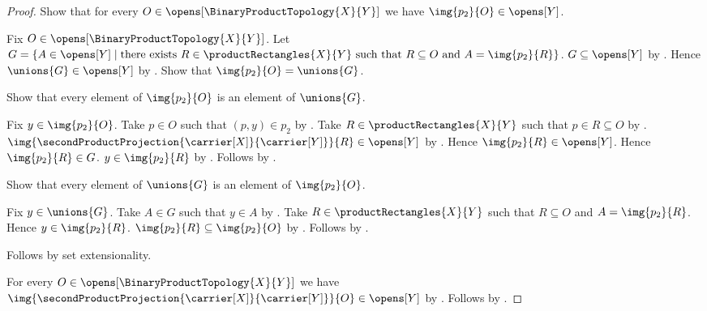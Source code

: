 \begin{proof}
    Show that for every $O\in\opens[\BinaryProductTopology{X}{Y}]$
        we have $\img{p_2}{O}\in\opens[Y]$.
    \begin{subproof}
        Fix $O\in\opens[\BinaryProductTopology{X}{Y}]$.
        Let $G=\{A\in\opens[Y]\mid
            \text{there exists $R\in\productRectangles{X}{Y}$ such that
                $R\subseteq O$ and $A=\img{p_2}{R}$}\}$.
        $G\subseteq\opens[Y]$ by .
        Hence $\unions{G}\in\opens[Y]$ by .
        Show that $\img{p_2}{O}=\unions{G}$.
        \begin{subproof}
            Show that every element of $\img{p_2}{O}$ is an element of
                $\unions{G}$.
            \begin{subproof}
                Fix $y\in\img{p_2}{O}$.
                Take $p\in O$ such that $(p,y)\in p_2$ by .
                Take $R\in\productRectangles{X}{Y}$ such that
                    $p\in R\subseteq O$ by .
                $\img{\secondProductProjection{
                    \carrier[X]}{\carrier[Y]}}{R}\in\opens[Y]$ by
                    .
                Hence $\img{p_2}{R}\in\opens[Y]$.
                Hence $\img{p_2}{R}\in G$.
                $y\in\img{p_2}{R}$ by .
                Follows by .
            \end{subproof}
            Show that every element of $\unions{G}$ is an element of
                $\img{p_2}{O}$.
            \begin{subproof}
                Fix $y\in\unions{G}$.
                Take $A\in G$ such that $y\in A$ by .
                Take $R\in\productRectangles{X}{Y}$ such that
                    $R\subseteq O$ and $A=\img{p_2}{R}$.
                Hence $y\in\img{p_2}{R}$.
                $\img{p_2}{R}\subseteq\img{p_2}{O}$ by
                    .
                Follows by .
            \end{subproof}
            Follows by set extensionality.
        \end{subproof}
    \end{subproof}
    For every $O\in\opens[\BinaryProductTopology{X}{Y}]$ we have
        $\img{\secondProductProjection{
            \carrier[X]}{\carrier[Y]}}{O}\in\opens[Y]$ by
        \auto.
    Follows by .
\end{proof}
